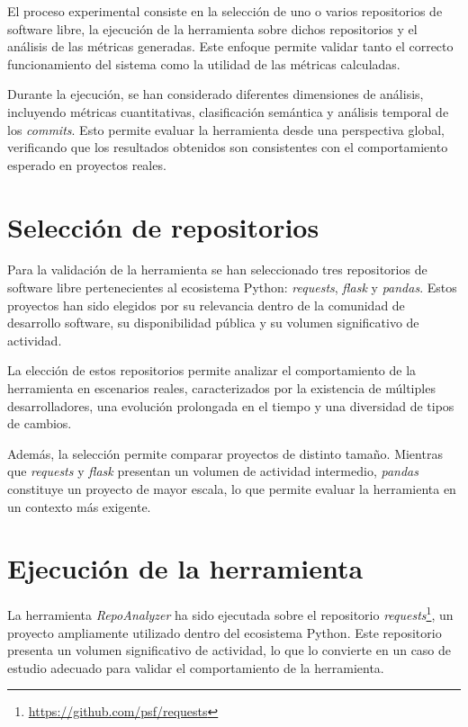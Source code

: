 \documentclass[a4paper, 12pt]{book}
\begin{document}
El proceso experimental consiste en la selección de uno o varios repositorios de software libre, la ejecución de la herramienta sobre dichos repositorios y el análisis de las métricas generadas. Este enfoque permite validar tanto el correcto funcionamiento del sistema como la utilidad de las métricas calculadas.

Durante la ejecución, se han considerado diferentes dimensiones de análisis, incluyendo métricas cuantitativas, clasificación semántica y análisis temporal de los \emph{commits}. Esto permite evaluar la herramienta desde una perspectiva global, verificando que los resultados obtenidos son consistentes con el comportamiento esperado en proyectos reales. 

\section{Selección de repositorios}
\label{sec:repositorios_exp}

Para la validación de la herramienta se han seleccionado tres repositorios de software libre pertenecientes al ecosistema Python: \emph{requests}, \emph{flask} y \emph{pandas}. Estos proyectos han sido elegidos por su relevancia dentro de la comunidad de desarrollo software, su disponibilidad pública y su volumen significativo de actividad.

La elección de estos repositorios permite analizar el comportamiento de la herramienta en escenarios reales, caracterizados por la existencia de múltiples desarrolladores, una evolución prolongada en el tiempo y una diversidad de tipos de cambios.

Además, la selección permite comparar proyectos de distinto tamaño. Mientras que \emph{requests} y \emph{flask} presentan un volumen de actividad intermedio, \emph{pandas} constituye un proyecto de mayor escala, lo que permite evaluar la herramienta en un contexto más exigente.

\section{Ejecución de la herramienta}
\label{sec:ejecucion}

La herramienta \emph{RepoAnalyzer} ha sido ejecutada sobre el repositorio \emph{requests}\footnote{\url{https://github.com/psf/requests}}, un proyecto ampliamente utilizado dentro del ecosistema Python. Este repositorio presenta un volumen significativo de actividad, lo que lo convierte en un caso de estudio adecuado para validar el comportamiento de la herramienta.
\end{document}

